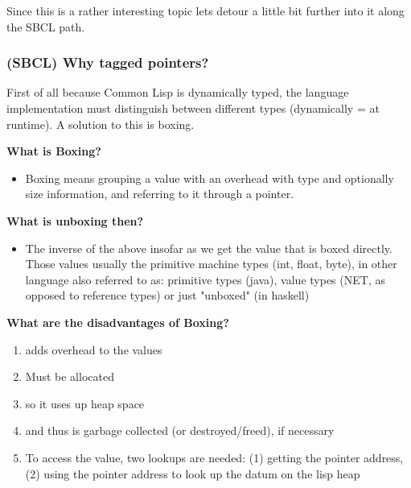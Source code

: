 \documentclass[11pt]{article}
\begin{document}
Since this is a rather interesting topic lets detour a little bit further into it along
the SBCL path.

\subsubsection{(SBCL) Why tagged pointers?}
\label{sec:org5dcfda4}
First of all because Common Lisp is dynamically typed, the language implementation
must distinguish between different types (dynamically = at runtime). A solution to
this is boxing.

\textbf{What is Boxing?}
\begin{itemize}
\item Boxing means grouping a value with an overhead with type and optionally size
information, and referring to it through a pointer.
\end{itemize}

\textbf{What is unboxing then?}
\begin{itemize}
\item The inverse of the above insofar as we get the value that is boxed directly.  Those
values usually the primitive machine types (int, float, byte), in other language
also referred to as: primitive types (java), value types (NET, as opposed to
reference types) or just "unboxed" (in haskell)
\end{itemize}

\textbf{What are the disadvantages of Boxing?}
\begin{enumerate}
\item adds overhead to the values
\item Must be allocated
\item so it uses up heap space
\item and thus is garbage collected (or destroyed/freed), if necessary
\item To access the value, two lookups are needed: (1) getting the pointer address, (2)
using the pointer address to look up the datum on the lisp heap
\end{enumerate}
\end{document}
